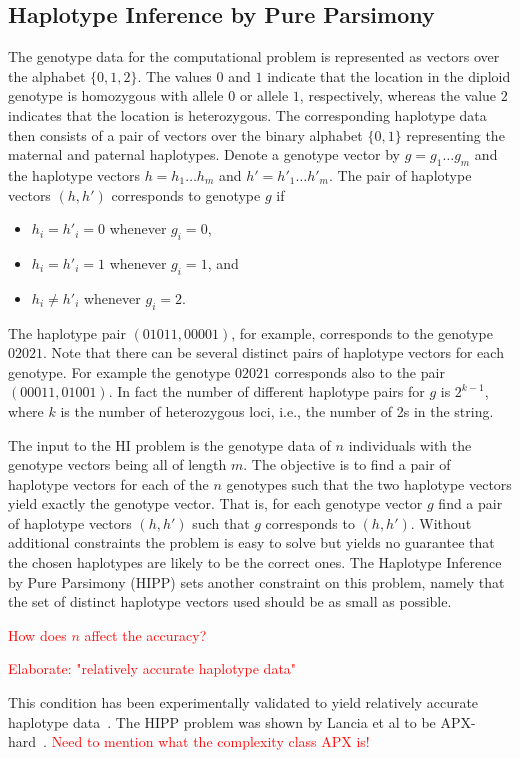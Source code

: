 \documentclass[12pt,a4paper]{article}
\newcommand{\TODO}[1]{\textcolor{red}{#1}}
\begin{document}
\subsection{Haplotype Inference by Pure Parsimony}
The genotype data for the computational problem is represented as vectors over the alphabet $\{0, 1, 2\}$. 
The values $0$ and $1$ indicate that the location in the diploid genotype is homozygous with allele $0$ or allele $1$, respectively, 
whereas the value $2$ indicates that the location is heterozygous.
The corresponding haplotype data then consists of a pair of vectors over the binary alphabet $\{0, 1\}$ representing the maternal and paternal haplotypes.
Denote a genotype vector by $g=g_1\dots g_m$ and the haplotype vectors $h=h_1\dots h_m$ and $h'=h'_1\dots h'_m$.
The pair of haplotype vectors $(h, h')$ corresponds to genotype $g$ if 
\begin{itemize}
\item $h_i=h'_i=0$ whenever $g_i = 0$,
\item $h_i=h'_i=1$ whenever $g_i = 1$, and
\item $h_i \neq h'_i$ whenever $g_i = 2$.
\end{itemize}
The haplotype pair $(01011, 00001)$, for example, corresponds to the genotype $02021$.
Note that there can be several distinct pairs of haplotype vectors for each genotype.
For example the genotype $02021$ corresponds also to the pair $(00011, 01001)$.
In fact the number of different haplotype pairs for $g$ is $2^{k-1}$, where $k$ is the number of heterozygous loci, i.e., the number of 2s in the string.

The input to the HI problem is the genotype data of $n$ individuals with the genotype vectors being all of length $m$.
The objective is to find a pair of haplotype vectors for each of the $n$ genotypes such that the two haplotype vectors yield exactly the genotype vector.
That is, for each genotype vector $g$ find a pair of haplotype vectors $(h, h')$ such that $g$ corresponds to $(h, h')$.
Without additional constraints the problem is easy to solve but yields no guarantee that the chosen haplotypes are likely to be the correct ones.
The Haplotype Inference by Pure Parsimony (HIPP) sets another constraint on this problem, namely that the set of distinct haplotype vectors used should be as small as possible.

\TODO{How does $n$ affect the accuracy?}

\TODO{Elaborate: "relatively accurate haplotype data"}

This condition has been experimentally validated to yield relatively accurate haplotype data~\cite{DBLP:journals/bioinformatics/WangX03a}.
The HIPP problem was shown by Lancia et al to be APX-hard~\cite{DBLP:journals/informs/LanciaPR04}.
\TODO{Need to mention what the complexity class APX is!}
\end{document}
